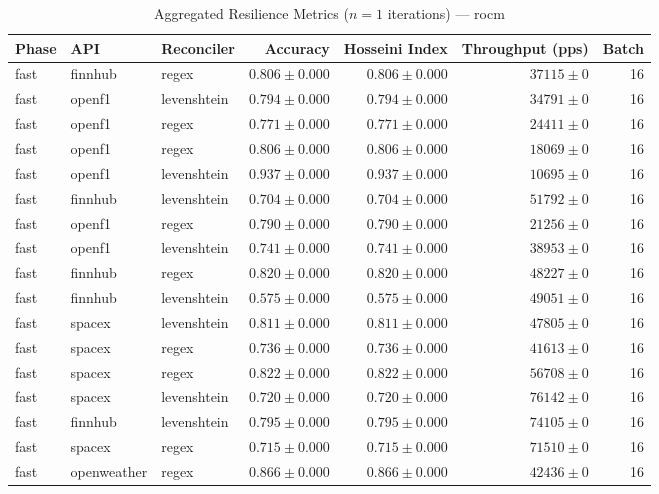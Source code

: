 
\begin{table}[htbp]
\caption{Aggregated Resilience Metrics ($n=1$ iterations) --- rocm}
\begin{tabular}{l l l r r r r}
\hline
Phase & API & Reconciler & Accuracy & Hosseini Index & Throughput (pps) & Batch \\
\hline
fast & finnhub & regex & $0.806\pm0.000$ & $0.806\pm0.000$ & $37115\pm0$ & 16 \\
fast & openf1 & levenshtein & $0.794\pm0.000$ & $0.794\pm0.000$ & $34791\pm0$ & 16 \\
fast & openf1 & regex & $0.771\pm0.000$ & $0.771\pm0.000$ & $24411\pm0$ & 16 \\
fast & openf1 & regex & $0.806\pm0.000$ & $0.806\pm0.000$ & $18069\pm0$ & 16 \\
fast & openf1 & levenshtein & $0.937\pm0.000$ & $0.937\pm0.000$ & $10695\pm0$ & 16 \\
fast & finnhub & levenshtein & $0.704\pm0.000$ & $0.704\pm0.000$ & $51792\pm0$ & 16 \\
fast & openf1 & regex & $0.790\pm0.000$ & $0.790\pm0.000$ & $21256\pm0$ & 16 \\
fast & openf1 & levenshtein & $0.741\pm0.000$ & $0.741\pm0.000$ & $38953\pm0$ & 16 \\
fast & finnhub & regex & $0.820\pm0.000$ & $0.820\pm0.000$ & $48227\pm0$ & 16 \\
fast & finnhub & levenshtein & $0.575\pm0.000$ & $0.575\pm0.000$ & $49051\pm0$ & 16 \\
fast & spacex & levenshtein & $0.811\pm0.000$ & $0.811\pm0.000$ & $47805\pm0$ & 16 \\
fast & spacex & regex & $0.736\pm0.000$ & $0.736\pm0.000$ & $41613\pm0$ & 16 \\
fast & spacex & regex & $0.822\pm0.000$ & $0.822\pm0.000$ & $56708\pm0$ & 16 \\
fast & spacex & levenshtein & $0.720\pm0.000$ & $0.720\pm0.000$ & $76142\pm0$ & 16 \\
fast & finnhub & levenshtein & $0.795\pm0.000$ & $0.795\pm0.000$ & $74105\pm0$ & 16 \\
fast & spacex & regex & $0.715\pm0.000$ & $0.715\pm0.000$ & $71510\pm0$ & 16 \\
fast & openweather & regex & $0.866\pm0.000$ & $0.866\pm0.000$ & $42436\pm0$ & 16 \\

\end{tabular}
\end{table}
